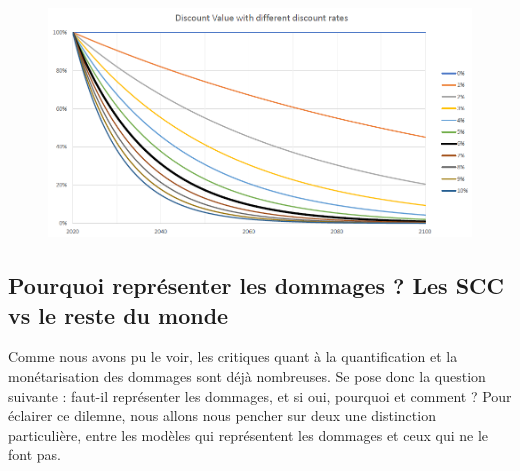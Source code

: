 \begin{figure}
    \centering
    \includegraphics[width=\linewidth]{figures/actualisation.PNG}
    \label{fig:discount-rate}
\end{figure}

\subsection{Pourquoi représenter les dommages ? Les SCC vs le reste du monde}

Comme nous avons pu le voir, les critiques quant à la quantification et la monétarisation des dommages sont déjà nombreuses. Se pose donc la question suivante : faut-il représenter les dommages, et si oui, pourquoi et comment ? Pour éclairer ce dilemne, nous allons nous pencher sur deux une distinction particulière, entre les modèles qui représentent les dommages et ceux qui ne le font pas. \\

